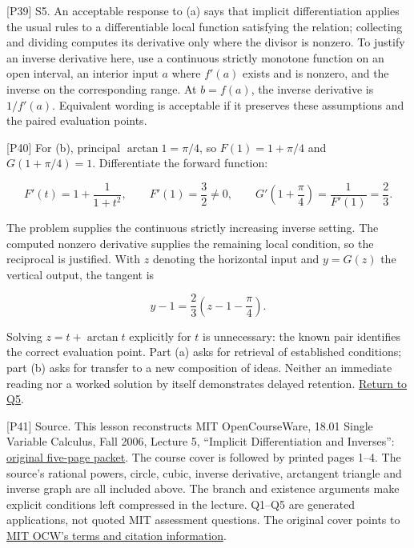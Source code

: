 \documentclass[
  11pt,
]{article}
\begin{document}
{[}P39{]} S5. An acceptable response to (a) says that implicit
differentiation applies the usual rules to a differentiable local
function satisfying the relation; collecting and dividing computes its
derivative only where the divisor is nonzero. To justify an inverse
derivative here, use a continuous strictly monotone function on an open
interval, an interior input \(a\) where \(f'(a)\) exists and is nonzero,
and the inverse on the corresponding range. At \(b=f(a)\), the inverse
derivative is \(1/f'(a)\). Equivalent wording is acceptable if it
preserves these assumptions and the paired evaluation points.

{[}P40{]} For (b), principal \(\arctan1=\pi/4\), so \(F(1)=1+\pi/4\) and
\(G(1+\pi/4)=1\). Differentiate the forward function:

\[
F'(t)=1+\frac1{1+t^2},\qquad F'(1)=\frac32\ne0,
\qquad G'\left(1+\frac\pi4\right)=\frac1{F'(1)}=\frac23.
\]

The problem supplies the continuous strictly increasing inverse setting.
The computed nonzero derivative supplies the remaining local condition,
so the reciprocal is justified. With \(z\) denoting the horizontal input
and \(y=G(z)\) the vertical output, the tangent is

\[
y-1=\frac23\left(z-1-\frac\pi4\right).
\]

Solving \(z=t+\arctan t\) explicitly for \(t\) is unnecessary: the known
pair identifies the correct evaluation point. Part (a) asks for
retrieval of established conditions; part (b) asks for transfer to a new
composition of ideas. Neither an immediate reading nor a worked solution
by itself demonstrates delayed retention. \protect\hyperlink{q5}{Return
to Q5}.

{[}P41{]} Source. This lesson reconstructs MIT OpenCourseWare, 18.01
Single Variable Calculus, Fall 2006, Lecture 5, ``Implicit
Differentiation and Inverses'':
\href{https://ocw.mit.edu/courses/18-01-single-variable-calculus-fall-2006/18d6a86a30a4bc046c5f7034d47587f1_lec5.pdf}{original
five-page packet}. The course cover is followed by printed pages 1--4.
The source's rational powers, circle, cubic, inverse derivative,
arctangent triangle and inverse graph are all included above. The branch
and existence arguments make explicit conditions left compressed in the
lecture. Q1--Q5 are generated applications, not quoted MIT assessment
questions. The original cover points to
\href{https://ocw.mit.edu/terms/}{MIT OCW's terms and citation
information}.
\end{document}
